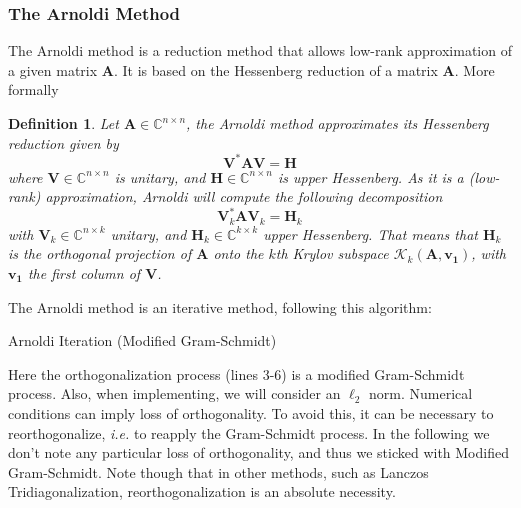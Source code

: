 \documentclass[11pt]{article}
\newtheorem{definition}{Definition}[section]
\numberwithin{equation}{section}
\begin{document}
\subsubsection{The Arnoldi Method}
The Arnoldi method is a reduction method that allows low-rank approximation of a given matrix $\mathbf{A}$. It is based on the Hessenberg reduction of a matrix $\mathbf{A}$. More formally
\begin{definition}
    Let $\mathbf{A}\in\mathbb{C}^{n\times n}$, the Arnoldi method approximates its Hessenberg reduction given by
    \begin{equation}
        \mathbf{V}^*\mathbf{A}\mathbf{V} = \mathbf{H}
    \end{equation}
    where $\mathbf{V}\in\mathbb{C}^{n\times n}$ is unitary, and $\mathbf{H}\in\mathbb{C}^{n\times n}$ is upper Hessenberg. As it is a (low-rank) approximation, Arnoldi will compute the following decomposition
    \begin{equation}
        \mathbf{V}_k^*\mathbf{A}\mathbf{V}_k = \mathbf{H}_k
    \end{equation}
    with $\mathbf{V}_k\in\mathbb{C}^{n\times k}$ unitary, and $\mathbf{H}_k\in\mathbb{C}^{k\times k}$ upper Hessenberg. That means that $\mathbf{H}_k$ is the orthogonal projection of $\mathbf{A}$ onto the $k$th Krylov subspace $\mathcal{K}_k(\mathbf{A},\mathbf{v_1})$, with $\mathbf{v_1}$ the first column of $\mathbf{V}$.
\end{definition}
The Arnoldi method is an iterative method, following this algorithm:
\begin{algorithm2e}
    \SetAlgoLined
    \caption{Arnoldi Iteration (Modified Gram-Schmidt)}
    \label{alg:arnoldi}
\end{algorithm2e}

Here the orthogonalization process (lines 3-6) is a modified Gram-Schmidt process. Also, when implementing, we will consider an $\ell_2$ norm. Numerical conditions can imply loss of orthogonality. To avoid this, it can be necessary to reorthogonalize, \textit{i.e.} to reapply the Gram-Schmidt process. In the following we don't note any particular loss of orthogonality, and thus we sticked with Modified Gram-Schmidt. Note though that in other methods, such as Lanczos Tridiagonalization, reorthogonalization is an absolute necessity.
\end{document}
